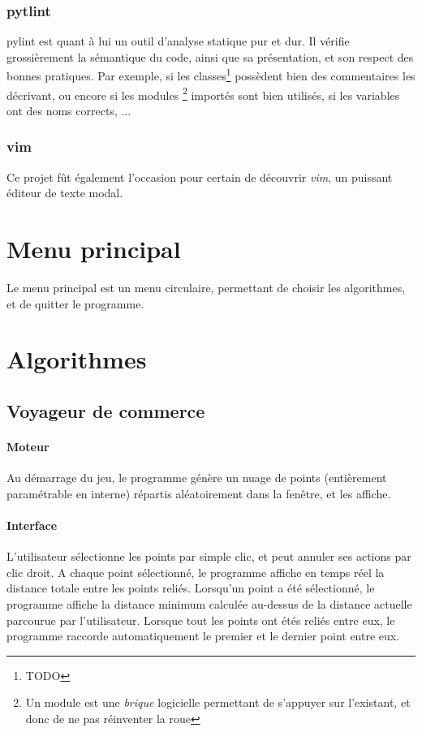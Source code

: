         \subsubsection{pytlint} pylint est quant à lui un outil d'analyse
            statique pur et dur. Il vérifie grossièrement la sémantique du code,
            ainsi que sa présentation, et son respect des bonnes pratiques.
            Par exemple, si les classes\footnote{TODO} possèdent bien
            des commentaires les décrivant, ou encore si les modules
            \footnote{Un module est une \emph{brique} logicielle permettant
            de s'appuyer sur l'existant, et donc de ne pas réinventer la roue}
            importés sont bien utilisés, si les variables ont des noms corrects, ...
        \subsubsection{vim}
            Ce projet fût également l'occasion pour certain de découvrir \emph{vim},
            un puissant éditeur de texte modal.

\section{Menu principal}
    Le menu principal est un menu circulaire,
    permettant de choisir les algorithmes, et de
    quitter le programme.

\section{Algorithmes}
    \subsection{Voyageur de commerce}
        \paragraph{Moteur}
            Au démarrage du jeu, le programme génère un nuage
            de points (entièrement paramétrable en interne)
            répartis aléatoirement dans la fenêtre, et les affiche.
        \paragraph{Interface}
            L'utilisateur sélectionne les points par simple clic,
            et peut annuler ses actions par clic droit.
            A chaque point sélectionné, le programme
            affiche en temps réel la distance totale entre
            les points reliés.
            Lorsqu'un point a été sélectionné, le programme
            affiche la distance minimum calculée au-dessus de
            la distance actuelle parcourue par l'utilisateur.
            Lorsque tout les points ont étés reliés entre eux,
            le programme raccorde automatiquement le premier
            et le dernier point entre eux.

